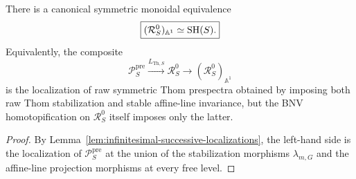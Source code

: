 \begin{theorem}
\label{thm:infinitesimal-symmetric-prespectrum-comparison}
There is a canonical symmetric monoidal equivalence
\[
  \boxed{
  (\mathcal R_S^0)_{\mathbb A^1}
  \simeq
  \mathrm{SH}(S).
  }
\]
Equivalently, the composite
\[
  \mathcal P_S^{\mathrm{pre}}
  \xrightarrow{L_{\mathrm{Th},S}}
  \mathcal R_S^0
  \longrightarrow
  (\mathcal R_S^0)_{\mathbb A^1}
\]
is the localization of raw symmetric Thom prespectra obtained by imposing both
raw Thom stabilization and stable affine-line invariance, but the BNV
homotopification on \(\mathcal R_S^0\) itself imposes only the latter.
\end{theorem}

\begin{proof}
By Lemma~\ref{lem:infinitesimal-successive-localizations}, the left-hand side is
the localization of \(\mathcal P_S^{\mathrm{pre}}\) at the union of the
stabilization morphisms \(\lambda_{m,G}\) and the affine-line projection
morphisms at every free level.


\end{proof}
